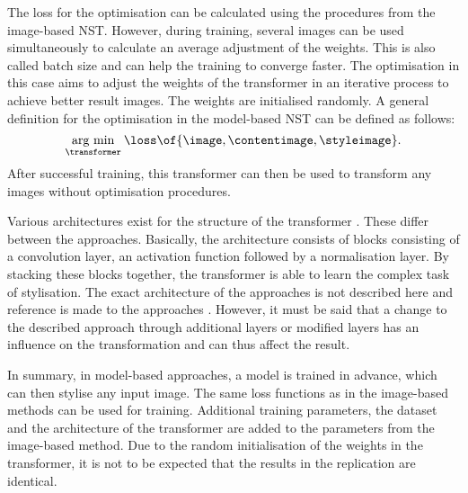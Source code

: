 The loss for the optimisation can be calculated using the procedures from the image-based \gls{NST}. However, during training, several images can be used simultaneously to calculate an average adjustment of the weights. This is also called batch size and can help the training to converge faster. The optimisation in this case aims to adjust the weights of the transformer in an iterative process to achieve better result images. The weights are initialised randomly. A general definition for the optimisation in the model-based \gls{NST} can be defined as follows:
\begin{equation*}
	\argmin{\transformer}{\loss\of{\image\eqcommasep \contentimage\eqcommasep \styleimage}} \eqtextdot
\end{equation*} 
After successful training, this transformer can then be used to transform any images without optimisation procedures.

Various architectures exist for the structure of the transformer \transformer{}. These differ between the approaches. Basically, the architecture consists of blocks consisting of a convolution layer, an activation function followed by a normalisation layer. By stacking these blocks together, the transformer is able to learn the complex task of stylisation. The exact architecture of the approaches is not described here and reference is made to the approaches \cite{JAL2016,ULVL2016,UVL2017}. However, it must be said that a change to the described approach through additional layers or modified layers has an influence on the transformation and can thus affect the result.

In summary, in model-based approaches, a model is trained in advance, which can then stylise any input image. The same loss functions as in the image-based methods can be used for training. Additional training parameters, the dataset and the architecture of the transformer are added to the parameters from the image-based method. Due to the random initialisation of the weights in the transformer, it is not to be expected that the results in the replication are identical.